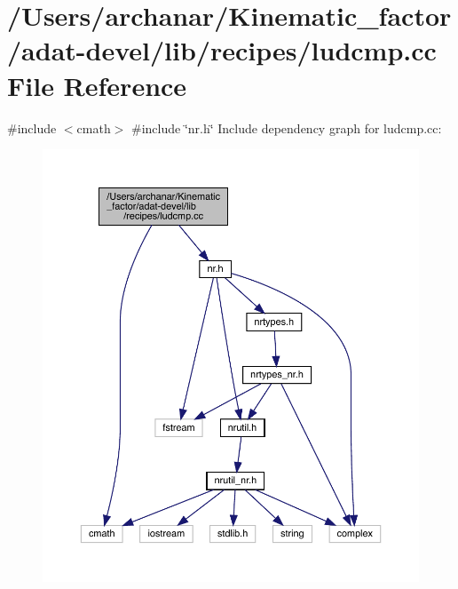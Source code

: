 \hypertarget{adat-devel_2lib_2recipes_2ludcmp_8cc}{}\section{/\+Users/archanar/\+Kinematic\+\_\+factor/adat-\/devel/lib/recipes/ludcmp.cc File Reference}
\label{adat-devel_2lib_2recipes_2ludcmp_8cc}
{\ttfamily \#include $<$cmath$>$}\newline
{\ttfamily \#include \char`\"{}nr.\+h\char`\"{}}\newline
Include dependency graph for ludcmp.\+cc\+:
\nopagebreak
\begin{figure}[H]
\begin{center}
\leavevmode
\includegraphics[width=350pt]{d5/d07/adat-devel_2lib_2recipes_2ludcmp_8cc__incl}
\end{center}
\end{figure}

